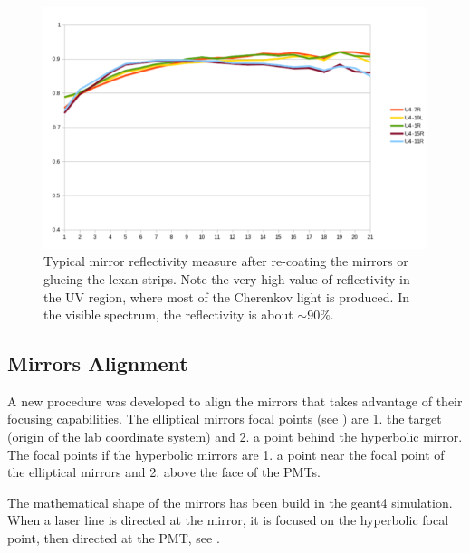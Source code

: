 \begin{figure}[h]
	\centering
	\includegraphics[width=0.95\columnwidth,keepaspectratio]{img/mirrorsReflectivityAfter.png}
	\caption{Typical mirror reflectivity measure after re-coating the mirrors or glueing the lexan strips. Note the very high value of reflectivity
		     in the UV region, where most of the Cherenkov light is produced. In the visible spectrum, the reflectivity is about $\sim 90\%$.}
	\label{fig:reflectivityAfter}
\end{figure}

\subsection{Mirrors Alignment}

A new procedure was developed to align the mirrors that takes advantage of their focusing capabilities. The elliptical mirrors focal points (see ) are 1. the target
(origin of the lab coordinate system)
and 2. a point behind the hyperbolic mirror. The focal points if the hyperbolic mirrors are 1. a point near the focal point of the elliptical mirrors and
2. above the face of the PMTs.

The mathematical shape of the mirrors has been build in the geant4 simulation. When a laser line is directed at the mirror,
it is focused on the hyperbolic focal point, then directed at the PMT, see .

